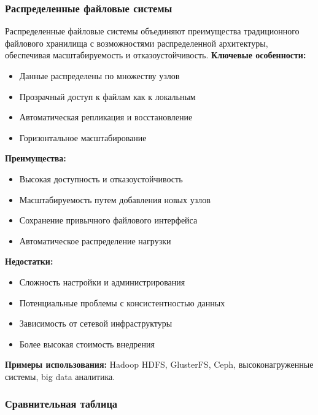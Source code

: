\subsubsection*{Распределенные файловые системы}
Распределенные файловые системы объединяют преимущества традиционного файлового хранилища с возможностями распределенной архитектуры, обеспечивая масштабируемость и отказоустойчивость\cite{kifer2012information}.
\textbf{Ключевые особенности:}
\begin{itemize}
\item Данные распределены по множеству узлов
\item Прозрачный доступ к файлам как к локальным
\item Автоматическая репликация и восстановление
\item Горизонтальное масштабирование
\end{itemize}
\textbf{Преимущества:}
\begin{itemize}
\item Высокая доступность и отказоустойчивость
\item Масштабируемость путем добавления новых узлов
\item Сохранение привычного файлового интерфейса
\item Автоматическое распределение нагрузки
\end{itemize}
\textbf{Недостатки:}
\begin{itemize}
\item Сложность настройки и администрирования
\item Потенциальные проблемы с консистентностью данных
\item Зависимость от сетевой инфраструктуры
\item Более высокая стоимость внедрения
\end{itemize}
\textbf{Примеры использования:} Hadoop HDFS, GlusterFS, Ceph, высоконагруженные системы, big data аналитика.
\subsubsection*{Сравнительная таблица}

